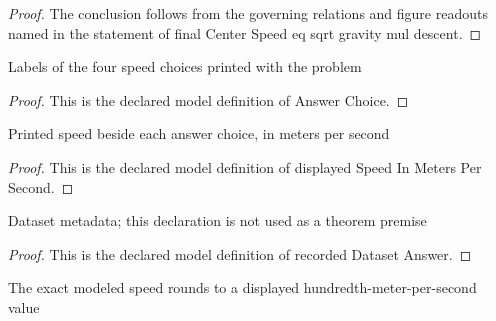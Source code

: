 \begin{proof}
  The conclusion follows from the governing relations and figure readouts named in the statement of final Center Speed eq sqrt gravity mul descent.
\end{proof}
\begin{definition}
  \label{def:physics:phyx-mini-0779:phyxminiproblems-problemphyxmini0779-answerchoice}
  Labels of the four speed choices printed with the problem
\end{definition}
\begin{proof}
  This is the declared model definition of Answer Choice.
\end{proof}
\begin{definition}
  \label{def:physics:phyx-mini-0779:phyxminiproblems-problemphyxmini0779-displayedspeedinmeterspersecond}
  Printed speed beside each answer choice, in meters per second
\end{definition}
\begin{proof}
  This is the declared model definition of displayed Speed In Meters Per Second.
\end{proof}
\begin{definition}
  \label{def:physics:phyx-mini-0779:phyxminiproblems-problemphyxmini0779-recordeddatasetanswer}
  Dataset metadata; this declaration is not used as a theorem premise
\end{definition}
\begin{proof}
  This is the declared model definition of recorded Dataset Answer.
\end{proof}
\begin{definition}
  \label{def:physics:phyx-mini-0779:phyxminiproblems-problemphyxmini0779-roundstodisplayedhundredth}
  The exact modeled speed rounds to a displayed hundredth-meter-per-second value
\end{definition}

